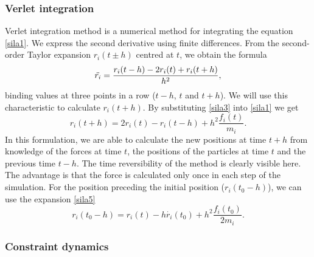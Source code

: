 \subsubsection{Verlet integration}
Verlet integration method is a numerical method for integrating the equation \ref{sila1}. We express the second derivative using finite differences. From the second-order Taylor expansion $r_i(t\pm h)$ centred at $t$, we obtain the formula
\begin{equation}\label{sila3}
	\Ddot{r_i}=\frac{r_i(t-h)-2r_i(t)+r_i(t+h)}{h^2},
\end{equation}
binding values at three points in a row ($t-h$, $t$ and $t+h$). We will use this characteristic to calculate $r_i(t+h)$. By substituting \ref{sila3} into \ref{sila1} we get 
\begin{equation}\label{sila4}
	r_i(t+h)=2r_i(t)-r_i(t-h)+h^2\frac{f_i(t)}{m_i}.
\end{equation}
In this formulation, we are able to calculate the new positions at time $t+h$ from knowledge of the forces at time $t$, the positions of the particles at time $t$ and the previous time $t-h$. The time reversibility of the method is clearly visible here. The advantage is that the force is calculated only once in each step of the simulation. For the position preceding the initial position ($r_i(t_0-h)$), we can use the expansion \ref{sila5}
\begin{equation}\label{sila5}
	r_i(t_0-h)=r_i(t)-h\dot{r_i}(t_0)+h^2\frac{f_i(t_0)}{2m_i}.
\end{equation}

\subsubsection{Constraint dynamics}

